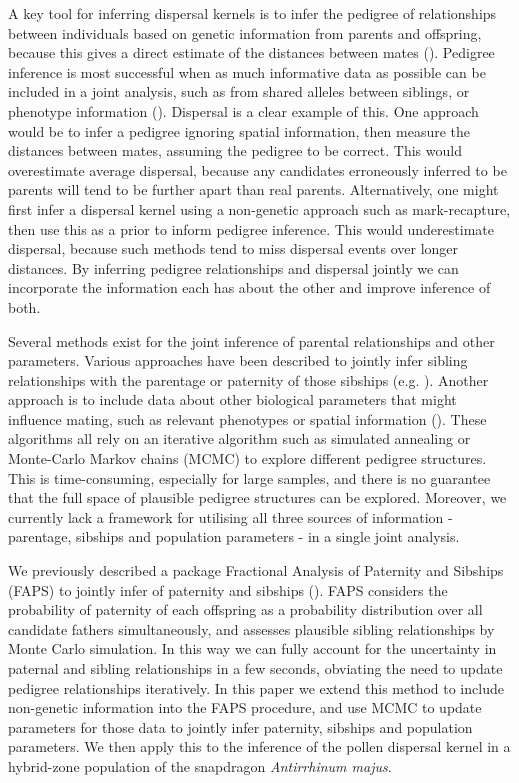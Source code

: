 \documentclass[10pt, a4paper, twocolumn]{article} %
\begin{document}
A key tool for inferring dispersal kernels is to infer the pedigree of relationships between individuals based on genetic information from parents and offspring, because this gives a direct estimate of the distances between mates (\cite{adams1992using, cain2000long, austerlitz2004using,pemberton2008wild}).
Pedigree inference is most successful when as much informative data as possible can be included in a joint analysis, such as from shared alleles between siblings, or phenotype information (\cite{neff2001bayesian, wang2007parentage}).
Dispersal is a clear example of this.
One approach would be to infer a pedigree ignoring spatial information, then measure the distances between mates, assuming the pedigree to be correct.
This would overestimate average dispersal, because any candidates erroneously inferred to be parents will tend to be further apart than real parents.
Alternatively, one might first infer a dispersal kernel using a non-genetic approach such as mark-recapture, then use this as a prior to inform pedigree inference.
This would underestimate dispersal, because such methods tend to miss dispersal events over longer distances.
By inferring pedigree relationships and dispersal jointly we can incorporate the information each has about the other and improve inference of both.

Several methods exist for the joint inference of parental relationships and other parameters.
Various approaches have been described to jointly infer sibling relationships with the parentage or paternity of those sibships (e.g. \cite{emery2001assignment, thomas2002sibship, jones2007estimating, wang2004sibship, anderson2016bayesian}).
Another approach is to include data about other biological parameters that might influence mating, such as relevant phenotypes or spatial information (\cite{neff2001bayesian, hadfield2006towards}).
These algorithms all rely on an iterative algorithm such as simulated annealing or Monte-Carlo Markov chains (MCMC) to explore different pedigree structures.
This is time-consuming, especially for large samples, and there is no guarantee that the full space of plausible pedigree structures can be explored.
Moreover, we currently lack a framework for utilising all three sources of information - parentage, sibships and population parameters - in a single joint analysis.

We previously described a package Fractional Analysis of Paternity and Sibships (FAPS) to jointly infer of paternity and sibships (\cite{ellis2018efficient}).
FAPS considers the probability of paternity of each offspring as a probability distribution over all candidate fathers simultaneously, and assesses plausible sibling relationships by Monte Carlo simulation.
In this way we can fully account for the uncertainty in paternal and sibling relationships in a few seconds, obviating the need to update pedigree relationships iteratively.
In this paper we extend this method to include non-genetic information into the FAPS procedure, and use MCMC to update parameters for those data to jointly infer paternity, sibships and population parameters.
We then apply this to the inference of the pollen dispersal kernel in a hybrid-zone population of the snapdragon \textit{Antirrhinum majus}.
\end{document}
